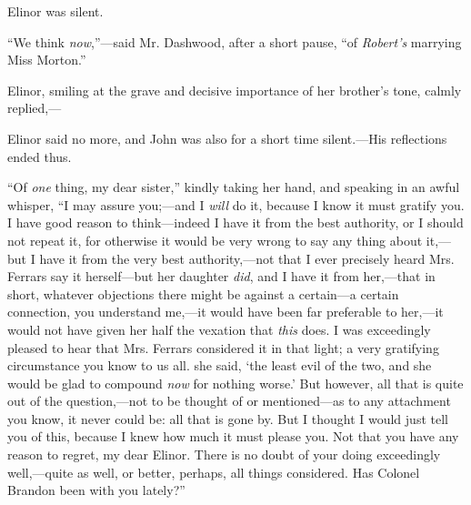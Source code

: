 Elinor was silent.

“We think {\em now},”---said Mr. Dashwood, after a short pause, “of {\em Robert's} marrying Miss Morton.”

Elinor, smiling at the grave and decisive importance of her brother's tone, calmly replied,---





Elinor said no more, and John was also for a short time silent.---His reflections ended thus.

“Of {\em one} thing, my dear sister,” kindly taking her hand, and speaking in an awful whisper, “I may assure you;---and I {\em will} do it, because I know it must gratify you. I have good reason to think---indeed I have it from the best authority, or I should not repeat it, for otherwise it would be very wrong to say any thing about it,---but I have it from the very best authority,---not that I ever precisely heard Mrs. Ferrars say it herself---but her daughter {\em did}, and I have it from her,---that in short, whatever objections there might be against a certain---a certain connection, you understand me,---it would have been far preferable to her,---it would not have given her half the vexation that {\em this} does. I was exceedingly pleased to hear that Mrs. Ferrars considered it in that light; a very gratifying circumstance you know to us all.  she said, ‘the least evil of the two, and she would be glad to compound {\em now} for nothing worse.' But however, all that is quite out of the question,---not to be thought of or mentioned---as to any attachment you know, it never could be: all that is gone by. But I thought I would just tell you of this, because I knew how much it must please you. Not that you have any reason to regret, my dear Elinor. There is no doubt of your doing exceedingly well,---quite as well, or better, perhaps, all things considered. Has Colonel Brandon been with you lately?”

